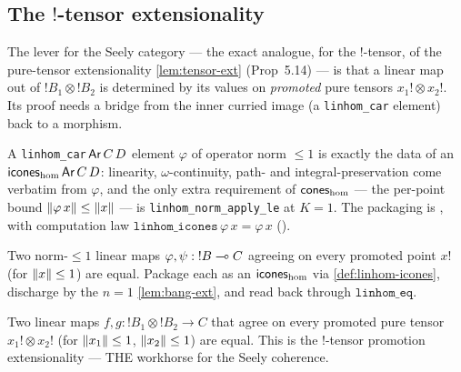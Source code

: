 \subsection{The \texorpdfstring{$\mathord{!}$}{!}-tensor extensionality}\label{sec:tens-excl}

The lever for the Seely category --- the exact analogue, for the
$\mathord{!}$-tensor, of the pure-tensor extensionality
\autoref{lem:tensor-ext} (Prop~5.14) --- is that a linear map out of
$\mathord{!}B_1 \otimes \mathord{!}B_2$ is determined by its values on
\emph{promoted} pure tensors $x_1! \otimes x_2!$. Its proof needs a
bridge from the inner curried image (a \texttt{linhom\_car} element)
back to a morphism.

\begin{definition}\label{def:linhom-icones}
\rocqok{}
A \texttt{linhom\_car}\,$\mathsf{Ar}\,C\,D$ element $\varphi$ of operator norm
$\leq 1$ is exactly the data of an
$\mathsf{icones}_{\mathrm{hom}}\,\mathsf{Ar}\,C\,D$: linearity, $\omega$-continuity,
path- and integral-preservation come verbatim from $\varphi$, and the
only extra requirement of $\mathsf{cones}_{\mathrm{hom}}$ --- the per-point
bound $\lVert \varphi\,x \rVert \leq \lVert x \rVert$ --- is
\texttt{linhom\_norm\_apply\_le} at $K = 1$. The packaging is
, with computation law
$\texttt{linhom\_icones}\,\varphi\,x = \varphi\,x$
().
\end{definition}

\begin{lemma}[$n = 1$ extensionality at the \texttt{linhom\_car} level]\label{lem:bang-ext-linhom}
\rocqok
{}
Two norm-$\leq 1$ linear maps $\varphi, \psi : \mathord{!}B \multimap C$
agreeing on every promoted point $x!$ (for $\lVert x \rVert \leq 1$) are
equal. Package each as an $\mathsf{icones}_{\mathrm{hom}}$ via
\autoref{def:linhom-icones}, discharge by the $n = 1$
\autoref{lem:bang-ext}, and read back through $\texttt{linhom\_eq}$.
\end{lemma}

\begin{lemma}[Paper Lemma \texttt{tens-excl-equal-charact}, $n = 2$]\label{lem:tens-excl-charact}
\rocqok
{}
Two linear maps $f, g : \mathord{!}B_1 \otimes \mathord{!}B_2 \to C$
that agree on every promoted pure tensor $x_1! \otimes x_2!$ (for
$\lVert x_1 \rVert \leq 1$, $\lVert x_2 \rVert \leq 1$) are equal. This is the
$\mathord{!}$-tensor promotion extensionality --- THE workhorse for the
Seely coherence.
\end{lemma}

